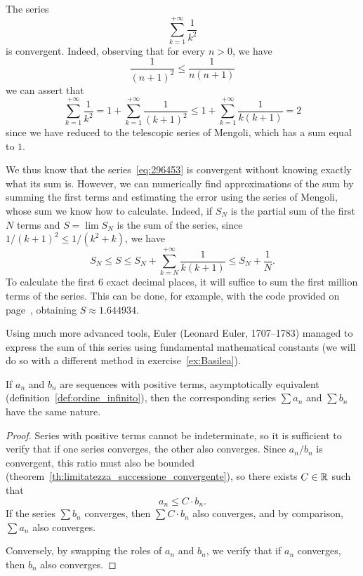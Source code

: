 \begin{example}\label{ex:52573}
\mymark{***}
The series
\begin{equation}\label{eq:296453}
 \sum_{k=1}^{+\infty} \frac{1}{k^2}
\end{equation}
is convergent.
Indeed, observing that for every $n>0$, we have
\[
  \frac{1}{(n+1)^2} \le \frac{1}{n(n+1)}
\]
we can assert that
\[
  \sum_{k=1}^{+\infty} \frac{1}{k^2}
  = 1 + \sum_{k=1}^{+\infty} \frac{1}{(k+1)^2}
  \le 1+ \sum_{k=1}^{+\infty} \frac{1}{k(k+1)}
  = 2
\]
since we have reduced to the telescopic series of Mengoli, which has a sum equal
to $1$.

We thus know that the series~\eqref{eq:296453} is convergent without knowing
exactly what its sum is.
However, we can numerically find approximations of the sum by summing the first
terms and estimating the error using the series of Mengoli, whose sum we know
how to calculate.
Indeed, if $S_N$ is the partial sum of the first $N$ terms and $S = \lim S_N$ is
the sum of the series, since $1/(k+1)^2 \le 1/(k^2+k)$, we have
\[
S_N
\le S
\le S_N + \sum_{k=N}^{+\infty} \frac{1}{k(k+1)}
\le S_N + \frac{1}{N}.
\]
To calculate the first 6 exact decimal places, it will suffice to sum the first
million terms of the series.
This can be done, for example, with the code provided on
page~\pageref{code:series}, obtaining $S\approx 1.644934$.

Using much more advanced tools, Euler 
(Leonard Euler, 1707--1783) managed to express the sum of this series using
fundamental mathematical constants (we will do so with a different method in
exercise~\ref{ex:Basilea}).
\end{example}

\begin{corollary}
\mymark{*}
If $a_n$ and $b_n$ are sequences with positive terms, asymptotically equivalent
(definition~\ref{def:ordine_infinito}), then the corresponding series $\sum a_n$
and $\sum b_n$ have the same nature.
\end{corollary}
%
\begin{proof}
\mymark{*}
Series with positive terms cannot be indeterminate, so it is sufficient to
verify that if one series converges, the other also converges.
Since $a_n / b_n$ is convergent, this ratio must also be bounded
(theorem~\ref{th:limitatezza_successione_convergente}), so there exists $C\in
{\mathbb R}$ such that
\[
   a_n \le C \cdot b_n.
\]
If the series $\sum b_n$ converges, then $\sum C \cdot b_n$ also converges, and
by comparison, $\sum a_n$ also converges.

Conversely, by swapping the roles of $a_n$ and $b_n$, we verify that if $a_n$
converges, then $b_n$ also converges.
\end{proof}

